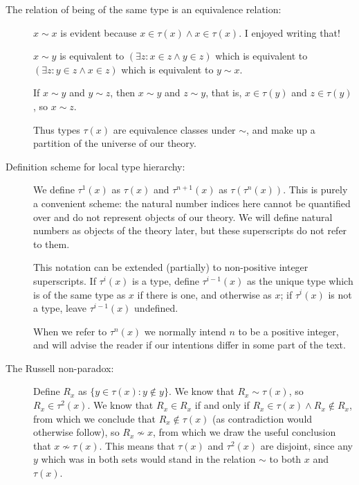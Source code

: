 \documentclass[12pt]{article}
\begin{document}
\begin{description}

\item[The relation of being of the same type is an equivalence relation:]  $x \sim x$ is evident because $x \in \tau(x) \wedge x \in \tau(x)$.  I enjoyed writing that!

$x \sim y$ is equivalent to $(\exists z: x \in z \wedge y \in z)$ which is equivalent to $(\exists z:y \in z \wedge x \in z)$ which is equivalent to $y \sim x$.

If $x \sim y$ and $y \sim z$, then $x \sim y$ and $z \sim y$, that is, $x \in \tau(y)$ and $z \in \tau(y)$, so $x \sim z$.

Thus types $\tau(x)$ are equivalence classes under $\sim$, and make up a partition of the universe of our theory.

\item[Definition scheme for local type hierarchy:]  We define $\tau^1(x)$ as $\tau(x)$ and $\tau^{n+1}(x)$ as $\tau(\tau^n(x))$.  This is purely a convenient scheme:  the natural number indices here cannot be quantified over and do not represent objects of our theory.  We will define natural numbers as objects of the theory later, but these superscripts do not refer to them.

This notation can be extended (partially) to non-positive integer superscripts.  If $\tau^i(x)$ is a type, define $\tau^{i-1}(x)$ as the unique
type which is of the same type as $x$ if there is one, and otherwise as $x$; if $\tau^i(x)$ is not a type, leave $\tau^{i-1}(x)$ undefined.   

When we refer to $\tau^n(x)$ we normally intend $n$ to be a positive integer, and will advise the reader if our intentions differ in some part of the text.

\item[The Russell non-paradox:]  Define $R_x$ as $\{y \in \tau(x):y \not\in y\}$.  We know that $R_x \sim \tau(x)$, so
$R_x \in \tau^2(x)$.  We know that $R_x \in R_x$ if and only if $R_x \in \tau(x) \wedge R_x \not\in R_x$, from which we conclude that $R_x \not\in \tau(x)$ (as contradiction would otherwise follow), so $R_x \not\sim x$, from which we draw the useful conclusion that $x \not\sim \tau(x)$.  This means that $\tau(x)$ and $\tau^2(x)$ are disjoint, 
since any $y$ which was in both sets would stand in the relation $\sim$ to both $x$ and $\tau(x)$.  


\end{description}
\end{document}
